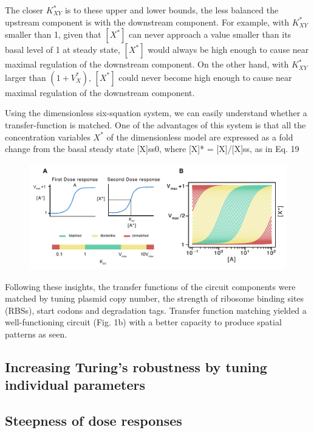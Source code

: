 The closer $K^*_{XY}$ is to these upper and lower bounds, the less balanced the upstream component is with the downstream component.
For example, with $K^*_{XY}$ smaller than 1, given that $[X^*]$ can never approach a value smaller than its basal level of 1 at steady state, $[X^*]$ would always be high enough to cause near maximal regulation of the downstream component.
On the other hand, with $K^*_{XY}$ larger than $(1+V^*_{X})$, $[X^*]$ could never become high enough to cause near maximal regulation of the downstream component.

Using the dimensionless six-squation system, we can easily understand whether a transfer-function is matched.
One of the advantages of this system is that all the concentration variables $X^*$ of the dimensionless model are expressed as a fold change from the basal steady state [X]ss0, where [X]* = [X]/[X]ss, as in Eq. 19

\begin{figure}[H]
    \centering
    \includegraphics[width=1\textwidth]{chapters/Chapter 2/balancing}
    \caption[]{\textbf{} } %
    \label{fig:balancing}
\end{figure}

Following these insights, the transfer functions of the circuit components were matched by tuning plasmid copy number, the strength of ribosome binding sites (RBSs), start codons and degradation tags. %
Transfer function matching yielded a well-functioning circuit (Fig. 1b) with a better capacity to produce spatial patterns as seen. %

\subsection{Increasing Turing's robustness by tuning individual parameters}
\subsection{Steepness of dose responses}
%

